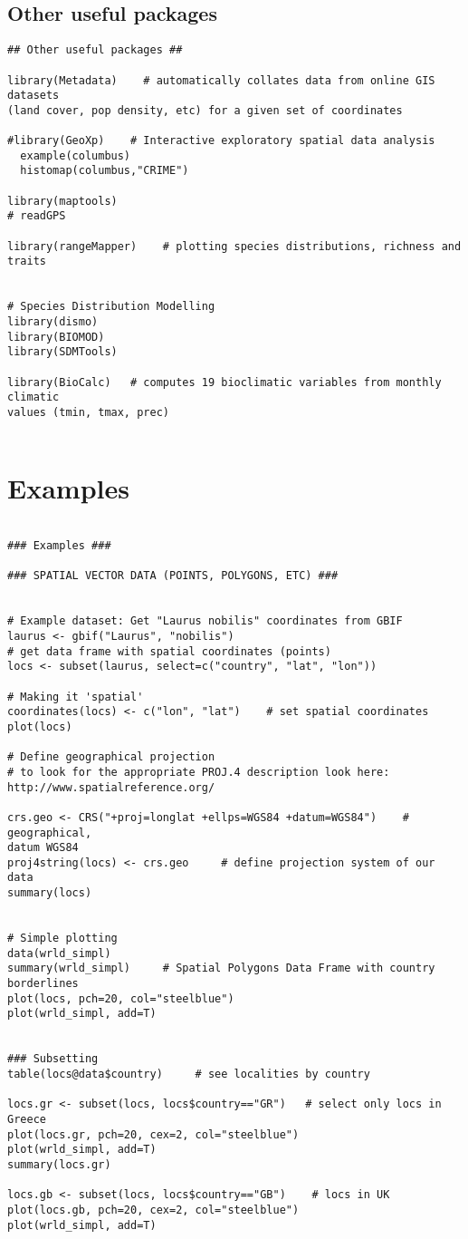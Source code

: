 \documentclass[11pt]{article} %
\begin{document}
\subsection{Other useful packages}
\begin{verbatim}
## Other useful packages ##
 
library(Metadata)    # automatically collates data from online GIS datasets
(land cover, pop density, etc) for a given set of coordinates
 
#library(GeoXp)    # Interactive exploratory spatial data analysis
  example(columbus)
  histomap(columbus,"CRIME")
 
library(maptools)
# readGPS
 
library(rangeMapper)    # plotting species distributions, richness and traits
 
 
# Species Distribution Modelling
library(dismo)
library(BIOMOD)
library(SDMTools)
 
library(BioCalc)   # computes 19 bioclimatic variables from monthly climatic
values (tmin, tmax, prec)
 
 \end{verbatim}
 
\newpage

\section{Examples}
\begin{verbatim}

### Examples ###
 
### SPATIAL VECTOR DATA (POINTS, POLYGONS, ETC) ###
 
 
# Example dataset: Get "Laurus nobilis" coordinates from GBIF
laurus <- gbif("Laurus", "nobilis")
# get data frame with spatial coordinates (points)
locs <- subset(laurus, select=c("country", "lat", "lon"))
 
# Making it 'spatial'
coordinates(locs) <- c("lon", "lat")    # set spatial coordinates
plot(locs)
 
# Define geographical projection
# to look for the appropriate PROJ.4 description look here:
http://www.spatialreference.org/
 
crs.geo <- CRS("+proj=longlat +ellps=WGS84 +datum=WGS84")    # geographical,
datum WGS84
proj4string(locs) <- crs.geo     # define projection system of our data
summary(locs)
 
 
# Simple plotting
data(wrld_simpl)
summary(wrld_simpl)     # Spatial Polygons Data Frame with country borderlines
plot(locs, pch=20, col="steelblue")
plot(wrld_simpl, add=T)
 
 
### Subsetting
table(locs@data$country)     # see localities by country
 
locs.gr <- subset(locs, locs$country=="GR")   # select only locs in Greece
plot(locs.gr, pch=20, cex=2, col="steelblue")
plot(wrld_simpl, add=T)
summary(locs.gr)
 
locs.gb <- subset(locs, locs$country=="GB")    # locs in UK
plot(locs.gb, pch=20, cex=2, col="steelblue")
plot(wrld_simpl, add=T)
\end{verbatim}
\newpage
\end{document}
